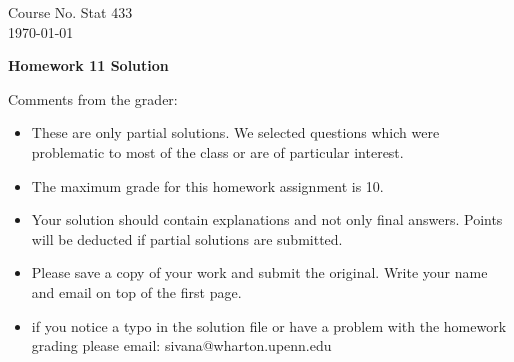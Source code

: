 \documentclass[10pt,a4paper]{article}
\begin{document}
\begin{flushleft}
Course No. Stat 433 \\
\today
\end{flushleft}

\begin{center}
{\Large{\bf  Homework 11 Solution}}
\end{center}

\textcolor[rgb]{0.98,0.00,0.00}{Comments from the grader:}
\begin{itemize}

    \item \textcolor[rgb]{0.98,0.00,0.00}{These are only partial solutions.  We selected
    questions which were problematic to most of the class or are of particular interest.}
    \item \textcolor[rgb]{0.98,0.00,0.00}{The maximum grade for this homework assignment is 10.}
    \item \textcolor[rgb]{0.98,0.00,0.00}{Your solution should contain explanations and not only
    final answers. Points will be deducted if partial solutions
    are submitted.}
    \item \textcolor[rgb]{0.98,0.00,0.00}{Please save a copy of your work and submit the original.
    Write your name and email on top of the first page.}
    \item \textcolor[rgb]{0.98,0.00,0.00}{if you notice a typo in the solution file or have a problem with the homework
    grading please email: sivana@wharton.upenn.edu
}
\end{itemize}
\end{document}
